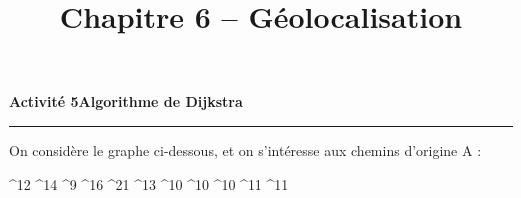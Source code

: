 \documentclass[a4paper]{article}
\begin{document}
\title{Chapitre 6 -- Géolocalisation}

\pagestyle{empty}

\date{}
\author{}

\maketitle{}

\thispagestyle{empty}
\noindent\textbf{Activité 5}\hfill{}\textbf{Algorithme de Dijkstra}
\smallskip
\hrule
\medskip

On considère le graphe ci-dessous, et on s'intéresse aux chemins d'origine A :

\medskip

\begin{center}
  \scalebox{0.7}{$
    \begin{psmatrix}[mnode=circle]
 &  & A &  &  & B \\ 
 &  &  &  &  &  &  & G \\ 
      D &  &  &  & F \\ 
	&  & C \\ 
	&  & E &  &  &  & H 
  \end{psmatrix}$}
  ^{12}
  ^{14}
  ^{9}
  ^{16}
  ^{21}
  ^{13}
  ^{10}
  ^{10}
  ^{10}
  ^{11}
  ^{11}
\end{center}

\medskip
\end{document}
